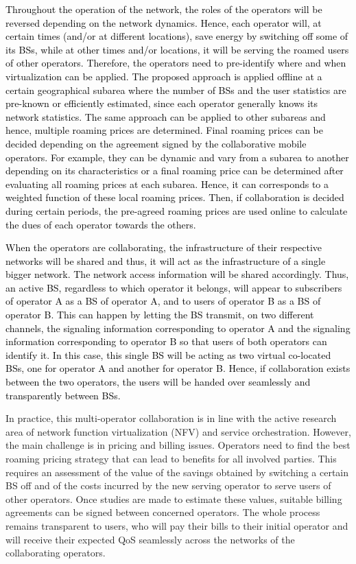 \documentclass[10pt, letter, twocolumn]{IEEEtran}
\begin{document}
\textcolor{black}{Throughout the operation of the network, the roles of the operators will be reversed depending on the network dynamics. Hence, each operator will, at certain times (and/or at different locations), save energy by switching off some of its BSs, while at other times and/or locations, it will be serving the roamed users of other operators. Therefore, the operators need to pre-identify where and when virtualization can be applied. The proposed approach is applied offline at a certain geographical subarea where the number of BSs and the user statistics are pre-known or efficiently estimated, since each operator generally knows its network statistics. The same approach can be applied to other subareas and hence, multiple roaming prices are determined. Final roaming prices can be decided depending on the agreement signed by the collaborative mobile operators. For example, they can be dynamic and vary from a subarea to another depending on its characteristics or a final roaming price can be determined after evaluating all roaming prices at each subarea. Hence, it can corresponds to a weighted function of these local roaming prices. Then, if collaboration is decided during certain periods, the pre-agreed roaming prices are used online to calculate the dues of each operator towards the others.}

\textcolor{black}{When the operators are collaborating, the infrastructure of their respective networks will be shared and thus, it will act as the infrastructure of a single bigger network. The network access information will be shared accordingly. Thus, an active BS, regardless to which operator it belongs, will appear to subscribers of operator A as a BS of operator A, and to users of operator B as a BS of operator B. This can happen by letting the BS transmit, on two different channels, the signaling information corresponding to operator A and the signaling information corresponding to operator B so that users of both operators can identify it. In this case, this single BS will be acting as two virtual co-located BSs, one for operator A and another for operator B. Hence, if collaboration exists between the two operators, the users will be handed over seamlessly and transparently between BSs.}

In practice, this multi-operator collaboration is in line with the active research area of network function virtualization (NFV) and service orchestration. However, the main challenge is in pricing and billing issues. Operators need to find the best roaming pricing strategy that can lead to benefits for all involved parties. This requires an assessment of the value of the savings obtained by switching a certain BS off and of the costs incurred by the new serving operator to serve users of other operators. Once studies are made to estimate these values, suitable billing agreements can be signed between concerned operators. The whole process remains transparent to users, who will pay their bills to their initial operator and will receive their expected QoS seamlessly across the networks of the collaborating operators.
\end{document}
